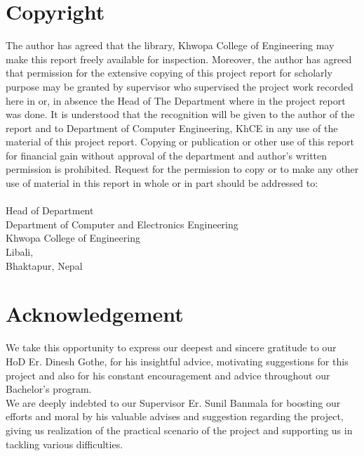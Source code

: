 		\large
			\chapter*{Copyright}
		\normalsize
			The author has agreed that the library, Khwopa College of Engineering  may make this report freely available for inspection. Moreover, the author has agreed that permission for the extensive copying of this project report for scholarly purpose may be granted by supervisor who supervised the project work recorded here in or, in absence the Head of The Department where in the project report was done. It is understood that the recognition will be given to the author of the report and to Department of Computer Engineering, KhCE in any use of the material of this project report. Copying or publication or other use of this report for financial gain without approval of the department and author's written permission is prohibited. Request for the permission to copy or to make any other use of material in this report in whole or in part should be addressed to: \\
			\vspace{1cm} \\
			Head of Department \\
			Department of Computer and Electronics Engineering\\
			Khwopa College of Engineering\\
			Libali,\\
			Bhaktapur, Nepal\\
		\break


		\large
			\chapter*{Acknowledgement}
		\normalsize
			We take this opportunity to express our deepest and sincere gratitude to our HoD Er. Dinesh Gothe, for his insightful advice, motivating suggestions for this project and also for his constant encouragement and advice throughout our Bachelor's program.
			\\We are deeply indebted to our Supervisor Er. Sunil Banmala for boosting our efforts and moral by his valuable advises and suggestion regarding the project, giving us realization of the practical scenario of the project and supporting us in tackling various difficulties.\\
			\vspace{1cm}

